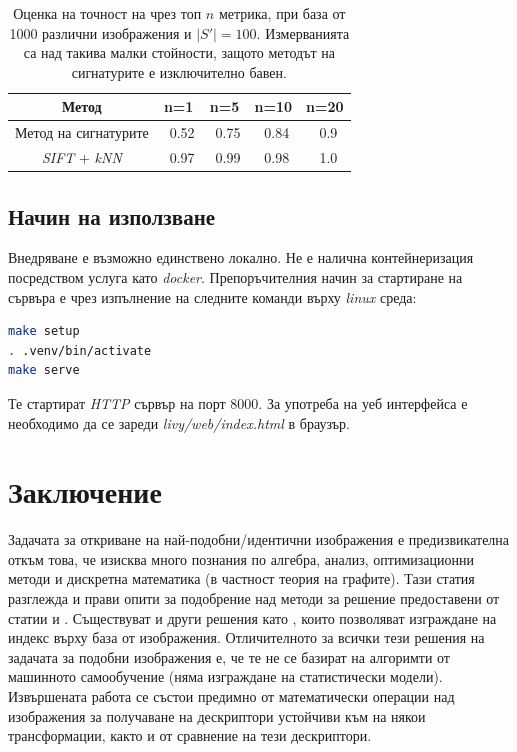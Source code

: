 \documentclass[a4paper,12pt]{article}
\begin{document}
\bigbreak

\begin{table}[h!]
    \centering
    \begin{tabular}{||c c c c c||} 
     \hline
     Метод & n=1 & n=5 & n=10 & n=20 \\ [0.5ex] 
     \hline\hline
     Метод на сигнатурите & ~0.52 & ~0.75 & ~0.84 & ~0.9 \\ 
     \textit{SIFT} + \textit{kNN} & ~0.97 & ~0.99 & ~0.98 & ~1.0 \\ [1ex] 
     \hline
    \end{tabular}
    \caption{Оценка на точност на чрез топ $n$ метрика, при база от 1000 различни изображения и $|S'| = 100$. Измерванията са над такива малки стойности, защото методът на сигнатурите е изключително бавен.}
    \label{table:1}
\end{table}

\subsection{Начин на използване}

Внедряване е възможно единствено локално. Не е налична контейнеризация посредством услуга като \textit{docker}. Препоръчителния начин за стартиране на сървъра е чрез изпълнение на следните команди върху \textit{linux} среда:

\begin{lstlisting}[language=bash, caption={Внедряване на сървъра}]
make setup
. .venv/bin/activate
make serve
\end{lstlisting}

\bigbreak

Те стартират \textit{HTTP} сървър на порт $8000$. За употреба на уеб интерфейса е необходимо да се зареди \textit{livy/web/index.html} в браузър.

\section{Заключение}

Задачата за откриване на най-подобни/идентични изображения е предизвикателна откъм това, че изисква много познания по алгебра, анализ, оптимизационни методи и дискретна математика (в частност теория на графите). Тази статия разглежда и прави опити за подобрение над методи за решение предоставени от статии \cite{spinimages} и \cite{sift}. Съществуват и други решения като \cite{spinimages}, които позволяват изграждане на индекс върху база от изображения. Отличителното за всички тези решения на задачата за подобни изображения е, че те не се базират на алгоримти от машинното самообучение (няма изграждане на статистически модели). Извършената работа се състои предимно от математически операции над изображения за получаване на дескриптори устойчиви към на някои трансформации, както и от сравнение на тези дескриптори.
\end{document}
